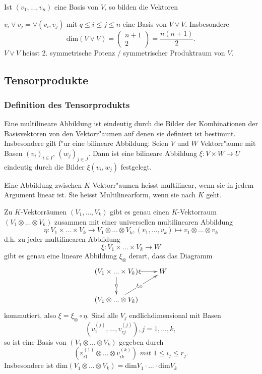 \documentclass[8pt, a4paper, twocolumn, landscape]{article}
\begin{document}
{\begin{theorem}
Ist $(v_1, ..., v_n)$ eine Basis von $V$, so bilden die Vektoren

$v_i \vee v_j = \vee (v_i, v_j)$ mit $q \leq i \leq j \leq n$ eine Basis von $V \vee V$. Insbesondere
$$
\mathrm{dim}(V \vee V) = \left(\begin{array}{c} n+1\\ 2 
\end{array} \right) = \frac{n(n+1)}{2}.
$$
$V \vee V$ heisst 2. symmetrische Potenz / symmetrischer Produktraum von $V$.
\end{theorem}

}

\subsection{Tensorprodukte}
\subsubsection{Definition des Tensorprodukts}
\begin{remark}
Eine multilineare Abbildung ist eindeutig durch die Bilder der Kombinationen der Basisvektoren von den Vektorr"aumen auf denen sie definiert ist bestimmt. Insbesondere gilt f"ur eine bilineare Abbildung:
Seien $V$ und $W$ Vektorr"aume mit Basen $(v_i)_{i \in I}$, $(w_j)_{j \in J}$. Dann ist eine bilineare Abbildung $\xi : V \times W \rightarrow U$ eindeutig durch die Bilder $\xi(v_i, w_j)$ festgelegt.
\end{remark}

\begin{definition}
Eine Abbildung zwischen $K$-Vektorr"aumen heisst multilinear, wenn sie in jedem Argument linear ist. Sie heisst Multilinearform, wenn sie nach $K$ geht.
\end{definition}

\begin{theorem}
Zu $K$-Vektorräumen $(V_1,...,V_k)$ gibt es genau einen $K$-Vektorraum $(V_1  \otimes ...  \otimes V_k)$ zusammen mit einer universellen multilinearen Abbildung 
$$
\eta : V_1 \times ... \times V_k  \rightarrow V_1\otimes ... \otimes V_k ,   (v_1,...,v_k) \mapsto v_1\otimes...\otimes v_k
$$
d.h. zu jeder multilinearen Abblidung
$$
\xi: V_1 \times ... \times V_k \rightarrow W
$$
gibt es genau eine lineare Abbildung $\xi_\otimes$ derart, dass das Diagramm 
\begin{gather*}
  \xymatrix{(V_1 \times ... \times V_k)  \ar[d]|{\eta} \ar[r]|{\xi} & W\\
    (V_1 \otimes ... \otimes V_k) \ar[ur]|{\xi_\otimes} & }
\end{gather*}
kommutiert, also $\xi = \xi_\otimes \circ \eta$. Sind alle $V_j$ endlichdimensional mit Basen 
$$
(v_1^{(j)},...,v_{rj}^{(j)}), j = 1,...,k,
$$
so ist eine Basis von $(V_1  \otimes ...  \otimes V_k)$ gegeben durch
$$
(v_{i1}^{(1)} \otimes...\otimes v_{ik}^{(k)}) \textit{ mit }  1 \leq i_j \leq r_j.
$$ 
Insbesondere ist $\mathrm{dim}(V_1\otimes...\otimes V_k) = \mathrm{dim} V_1\cdot ... \cdot \mathrm{dim}V_k$
\end{theorem}
\end{document}
